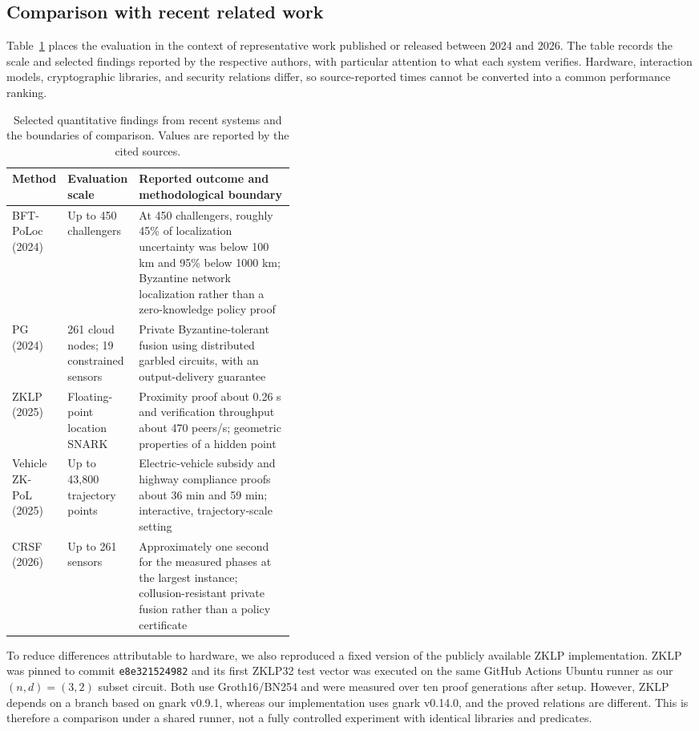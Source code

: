 \subsection{Comparison with recent related work}
Table~\ref{tab:recent-context} places the evaluation in the context of representative work published or released between 2024 and 2026. The table records the scale and selected findings reported by the respective authors, with particular attention to what each system verifies. Hardware, interaction models, cryptographic libraries, and security relations differ, so source-reported times cannot be converted into a common performance ranking.

\begin{table}[htbp]\centering\footnotesize
\caption{Selected quantitative findings from recent systems and the boundaries of comparison. Values are reported by the cited sources.}\label{tab:recent-context}
\begin{tabularx}{\linewidth}{@{}p{0.17\linewidth}p{0.24\linewidth}X@{}}\toprule
Method&Evaluation scale&Reported outcome and methodological boundary\\\midrule
BFT-PoLoc~\cite{BFTPoLoc} (2024)&Up to 450 challengers&At 450 challengers, roughly 45\% of localization uncertainty was below 100 km and 95\% below 1000 km; Byzantine network localization rather than a zero-knowledge policy proof\\
PG~\cite{PG} (2024)&261 cloud nodes; 19 constrained sensors&Private Byzantine-tolerant fusion using distributed garbled circuits, with an output-delivery guarantee\\
ZKLP~\cite{ZKLP} (2025)&Floating-point location SNARK&Proximity proof about 0.26 s and verification throughput about 470 peers/s; geometric properties of a hidden point\\
Vehicle ZK-PoL~\cite{VehiclePolicy} (2025)&Up to 43,800 trajectory points&Electric-vehicle subsidy and highway compliance proofs about 36 min and 59 min; interactive, trajectory-scale setting\\
CRSF~\cite{CRSF} (2026)&Up to 261 sensors&Approximately one second for the measured phases at the largest instance; collusion-resistant private fusion rather than a policy certificate\\\bottomrule
\end{tabularx}
\end{table}

To reduce differences attributable to hardware, we also reproduced a fixed version of the publicly available ZKLP implementation. ZKLP was pinned to commit \texttt{e8e321524982} and its first ZKLP32 test vector was executed on the same GitHub Actions Ubuntu runner as our $(n,d)=(3,2)$ subset circuit. Both use Groth16/BN254 and were measured over ten proof generations after setup. However, ZKLP depends on a branch based on gnark v0.9.1, whereas our implementation uses gnark v0.14.0, and the proved relations are different. This is therefore a comparison under a shared runner, not a fully controlled experiment with identical libraries and predicates.

